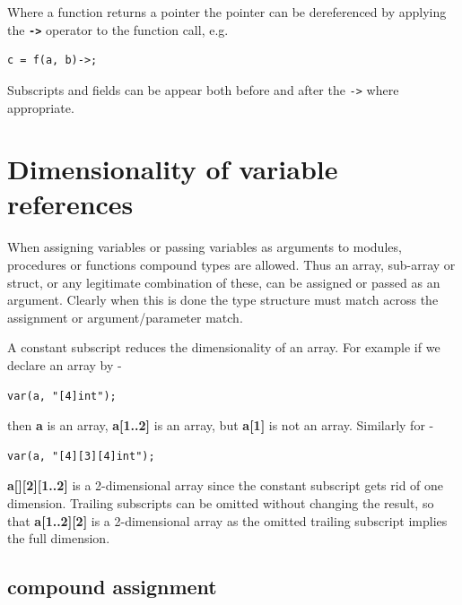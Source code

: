             Where a function returns a pointer the pointer can be
            dereferenced by applying the {\bf \verb'->'} operator to the
            function call, e.g.
            \begin{lstlisting}[gobble=12, language=threepl]
               c = f(a, b)->;
            \end{lstlisting}
            Subscripts and fields can be appear both before and after the
            \verb'->' where appropriate.
            




    \section{Dimensionality of variable references}

        When assigning variables or passing variables as arguments to
        modules, procedures or functions compound types are allowed. Thus an
        array, sub-array or struct, or any legitimate combination of these,
        can be assigned or passed as an argument. Clearly when this is done
        the type structure must match across the assignment or
        argument/parameter match.

        A constant subscript reduces the dimensionality of an array. For
        example if we declare an array by -
        \begin{lstlisting}[gobble=8, language=threepl]
              var(a, "[4]int");
        \end{lstlisting}
        then {\bf a} is an array, {\bf a[1..2]} is an array, but {\bf a[1]} is not
        an array. Similarly for -
        \begin{lstlisting}[gobble=8, language=threepl]
           var(a, "[4][3][4]int");
        \end{lstlisting}
        {\bf a[][2][1..2]} is a 2-dimensional array since the constant
        subscript gets rid of one dimension. Trailing subscripts can be
        omitted without changing the result, so that {\bf a[1..2][2]} is a
        2-dimensional array as the omitted trailing subscript implies the
        full dimension.

        \subsection{compound assignment}

